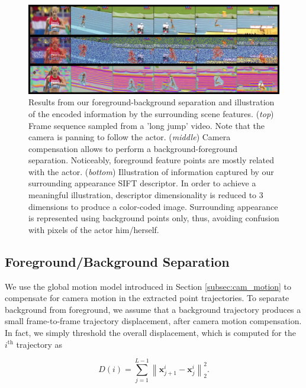 \documentclass[runningheads]{llncs}
\begin{document}
\begin{figure}[t!]
\begin{center}
\includegraphics[width=0.98\linewidth]{approach.png}
\end{center}
\vspace{-6pt}\caption{Results from our foreground-background separation and illustration of the encoded information by the surrounding scene features. (\emph{top}) Frame sequence sampled from a 'long jump' video. Note that the camera is panning to follow the actor. (\emph{middle}) Camera compensation allows to perform a background-foreground separation. Noticeably, foreground feature points are mostly related with the actor. (\emph{bottom}) Illustration of information captured by our surrounding appearance SIFT descriptor. In order to achieve a meaningful illustration, descriptor dimensionality is reduced to 3 dimensions to produce a color-coded image. Surrounding appearance is represented using background points only, thus, avoiding confusion with pixels of the actor him/herself.}\label{fig:approach} \vspace{-6pt}
\end{figure}


\subsection{Foreground/Background Separation}\vspace{-2pt}
We use the global motion model introduced in Section \ref{subsec:cam_motion} to compensate for camera motion in the extracted point trajectories. To separate background from foreground, we assume that a background trajectory produces a small frame-to-frame trajectory displacement, after camera motion compensation. In fact, we simply threshold the overall displacement, which is computed for the $i^{\text{th}}$ trajectory as

\vspace{-6pt}
\begin{equation}
D(i) = \sum _{j=1}^{L-1}\left\|\mathbf{x}_{j+1}^i-\mathbf{x}_{j}^i\right\|_2^2.
\end{equation}
\vspace{-6pt}
\end{document}
